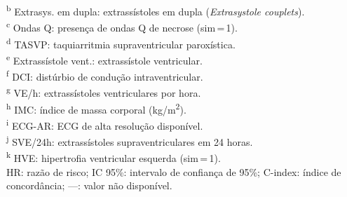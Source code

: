 \begin{table}[htbp]
\begin{flushleft}
		\textsuperscript{b} Extrasys. em dupla: extrassístoles em dupla (\textit{Extrasystole couplets}).\\
		\textsuperscript{c} Ondas Q: presença de ondas Q de necrose (sim\,=\,1).\\
		\textsuperscript{d} TASVP: taquiarritmia supraventricular paroxística.\\
		\textsuperscript{e} Extrassístole vent.: extrassístole ventricular.\\
		\textsuperscript{f} DCI: distúrbio de condução intraventricular.\\
		\textsuperscript{g} VE/h: extrassístoles ventriculares por hora.\\
		\textsuperscript{h} IMC: índice de massa corporal (kg/m\textsuperscript{2}).\\
		\textsuperscript{i} ECG-AR: ECG de alta resolução disponível.\\
		\textsuperscript{j} SVE/24h: extrassístoles supraventriculares em 24 horas.\\
		\textsuperscript{k} HVE: hipertrofia ventricular esquerda (sim\,=\,1).\\
		HR: razão de risco; IC 95\%: intervalo de confiança de 95\%;
		C-index: índice de concordância; ---: valor não disponível.
	\end{flushleft}
\end{table}

\FloatBarrier


